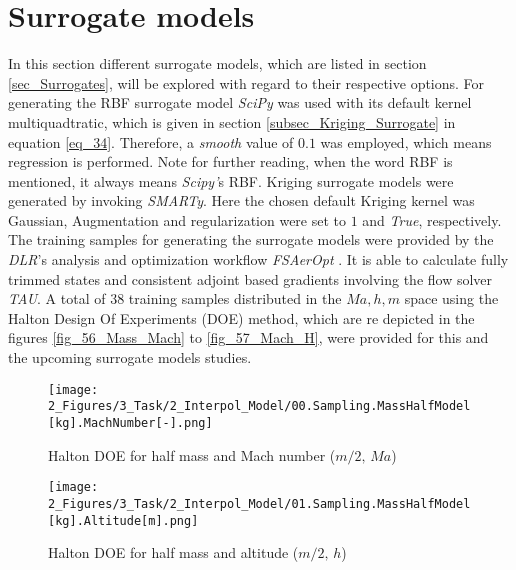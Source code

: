 \section{Surrogate models}
In this section different 
surrogate models, which 
are listed in section \ref{sec_Surrogates},
will be explored with regard to 
their respective options.
For generating the RBF surrogate model \emph{SciPy} was used 
with its default kernel multiquadtratic, which is given
in section \ref{subsec_Kriging_Surrogate} 
in equation \eqref{eq_34}. Therefore, a \emph{smooth}
value \cite{noauthor_rbf_2021} of $0.1$ was employed, which 
means regression is performed. Note for 
further reading, when the word RBF is
mentioned, it always means \emph{Scipy'}s RBF.
Kriging surrogate models 
were generated by invoking \emph{SMARTy}. Here the chosen default Kriging
kernel was 
Gaussian, Augmentation and regularization were set 
to $1$ and \emph{True}, respectively. 
The training samples 
for generating the surrogate models 
were provided  by the \emph{DLR}'s analysis and 
optimization workflow \emph{FSAerOpt} 
\cite{merle_high-fidelity_2019}. It is 
able to calculate fully trimmed states 
and consistent adjoint based gradients involving the 
flow solver \emph{TAU}. A total of $38$
training samples distributed in the 
$Ma,h,m$ space using the Halton Design Of 
Experiments (DOE) method, which 
are re depicted 
in the figures \ref{fig_56_Mass_Mach}
to \ref{fig_57_Mach_H},  were provided 
for this and the upcoming surrogate 
models studies.
\newline 

\begin{figure}[!h]
    \begin{minipage}[h]{0.46\textwidth}
        \centering
        \texttt{[image: 2\_Figures/3\_Task/2\_Interpol\_Model/00.Sampling.MassHalfModel[kg].MachNumber[-].png]}
        \caption{Halton DOE for half mass and Mach number ($m/2, \, Ma$)}
        \label{fig_56_Mass_Mach}    
    \end{minipage}
    \hfill
    \begin{minipage}{0.46\textwidth}
        \centering
        \texttt{[image: 2\_Figures/3\_Task/2\_Interpol\_Model/01.Sampling.MassHalfModel[kg].Altitude[m].png]}
        \caption{Halton DOE for half mass and altitude ($m/2, \, h$)}
        \label{fig_57_Mass_H}    
    \end{minipage}
\end{figure} 

